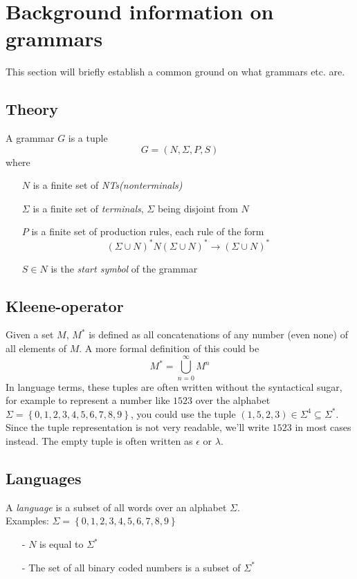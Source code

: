 \documentclass[a4paper]{article}
\newcommand{\tuple}[1]{\left( #1 \right)}
\newcommand{\set}[1]{\left\lbrace #1 \right\rbrace}
\begin{document}
\section{Background information on grammars}
This section will briefly establish a common ground on what grammars etc. are.
\subsection{Theory}
A grammar $G$ is a tuple 
$$ G = \tuple{N, \Sigma, P, S} $$
where \begin{itemize}
\item[$N$] is a finite set of \textit{NTs(nonterminals)}
\item[$\Sigma$] is a finite set of \textit{terminals}, $\Sigma$ being disjoint from $N$
\item[$P$] is a finite set of production rules, each rule of the form 
$$ (\Sigma\cup N)^*N(\Sigma\cup N)^*\to (\Sigma\cup N)^* $$
\item[$S\in N$] is the \textit{start symbol} of the grammar 
\end{itemize}

\subsection{Kleene-operator}
Given a set $M$, $M^*$ is defined as all concatenations of any number (even none) of all elements of $M$. A more formal definition of this could be 
$$M^* = \bigcup_{n=0}^{\infty}M^n$$
In language terms, these tuples are often written without the syntactical sugar, for example to represent a number like $1523$ over the alphabet $\Sigma=\set{0,1,2,3,4,5,6,7,8,9}$, you could use the tuple $\tuple{1,5,2,3}\in\Sigma^4\subseteq\Sigma^*$. Since the tuple representation is not very readable, we'll write $1523$ in most cases instead. The empty tuple is often written as $\epsilon$ or $\lambda$.

\subsection{Languages}
A \textit{language} is a subset of all words over an alphabet $\Sigma$. \\
Examples: $ \Sigma = \set{0,1,2,3,4,5,6,7,8,9} $
\begin{itemize}
\item[-] $N$ is equal to $\Sigma^*$
\item[-] The set of all binary coded numbers is a subset of $\Sigma^*$
\end{itemize}
\end{document}
